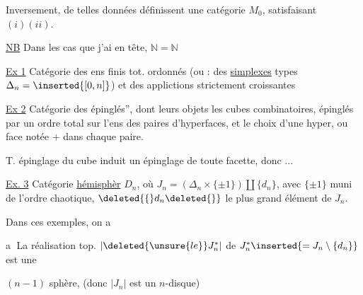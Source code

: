 Inversement, de telles données définissent une catégorie $M_0$, satisfaisant $(i)(ii)$.

\uline{NB} Dans les cas que j'ai en tête, $\mathbb N=\mathbb N$

\uline{Ex 1} Catégorie des ens finis tot. ordonnés (ou : des \uline{simplexes} types $\Delta_n=\inserted{[0,n]}$) et des applictions strictement croissantes

\uline{Ex 2} Catégorie des   épinglés'',  dont leurs objets  les  cubes combinatoires,
  épinglés par un ordre total sur l'ens des paires d'hyperfaces,  et le choix d'une hyper, ou face notée $+$ dans chaque paire.

T. épinglage du cube induit un épinglage de toute facette, donc ... 

\uline{Ex. 3} Catégorie   \uline{hémisphèr} $D_n$, où $J_n=(\Delta_n\times\{\pm1\})\amalg\{d_n\}$, avec $\{\pm1\}$ muni de l'ordre chaotique, $\deleted{\{}d_n\deleted{\}}$ le plus grand élément de $J_n$.

Dans  ces  exemples, on a

\textcircled{a}  La réalisation top. $|\deleted{\unsure{le}} J_n^*|$ de $J_n^*\inserted{=J_n\setminus\{d_n\}}$ est une 

 $(n-1)$ sphère, (donc $|J_n|$ est un $n$-disque)
